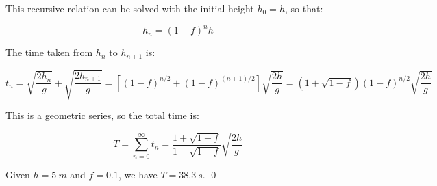 \documentclass[12pt]{article}
\begin{document}
This recursive relation can be solved with the initial height $h_{0} = h$, so that:

\begin{equation}
    h_{n} = (1 - f)^{n} h
\end{equation}

The time taken from $h_{n}$ to $h_{n+1}$ is:

\begin{equation}
    t_{n} = \sqrt{\frac{2h_{n}}{g}} + \sqrt{\frac{2h_{n+1}}{g}} = \left[ (1 - f)^{n/2} + (1 - f)^{(n + 1)/2} \right] \sqrt{\frac{2h}{g}} = (1 + \sqrt{1 - f}) (1 - f)^{n/2} \sqrt{\frac{2h}{g}}
\end{equation}

This is a geometric series, so the total time is:

\begin{equation}
    T = \sum_{n = 0}^{\infty} t_{n} = \frac{1 + \sqrt{1 - f}}{1 - \sqrt{1 - f}} \sqrt{\frac{2h}{g}}
\end{equation}

Given $h = \qty{5}{m}$ and $f = 0.1$, we have $T = \qty{38.3}{s}$.
\qed


 
\end{document}
